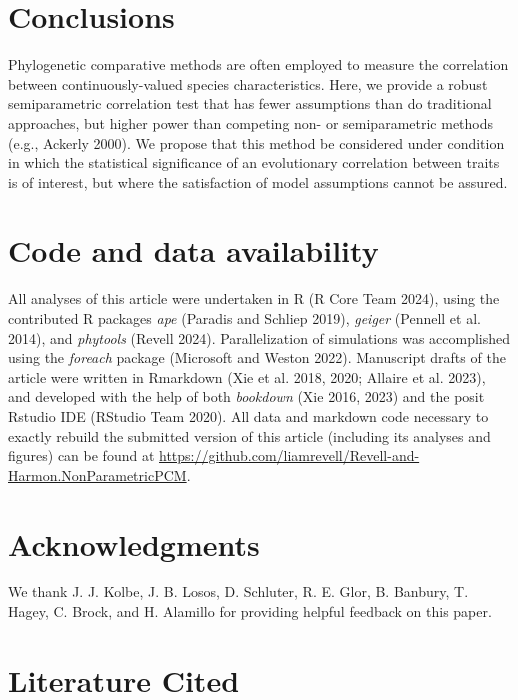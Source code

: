 \documentclass[fleqn,10pt,lineno]{wlpeerj} %
\begin{document}
\section{Conclusions}\label{conclusions}

Phylogenetic comparative methods are often employed to measure the correlation between continuously-valued species characteristics. Here, we provide a robust semiparametric correlation test that has fewer assumptions than do traditional approaches, but higher power than competing non- or semiparametric methods (e.g., Ackerly 2000). We propose that this method be considered under condition in which the statistical significance of an evolutionary correlation between traits is of interest, but where the satisfaction of model assumptions cannot be assured.

\section{Code and data availability}\label{code-and-data-availability}

All analyses of this article were undertaken in R (R Core Team 2024), using the contributed R packages \emph{ape} (Paradis and Schliep 2019), \emph{geiger} (Pennell et al. 2014), and \emph{phytools} (Revell 2024). Parallelization of simulations was accomplished using the \emph{foreach} package (Microsoft and Weston 2022). Manuscript drafts of the article were written in Rmarkdown (Xie et al. 2018, 2020; Allaire et al. 2023), and developed with the help of both \emph{bookdown} (Xie 2016, 2023) and the posit Rstudio IDE (RStudio Team 2020). All data and markdown code necessary to exactly rebuild the submitted version of this article (including its analyses and figures) can be found at \url{https://github.com/liamrevell/Revell-and-Harmon.NonParametricPCM}.

\section{Acknowledgments}\label{acknowledgments}

We thank J. J. Kolbe, J. B. Losos, D. Schluter, R. E. Glor, B. Banbury, T. Hagey, C. Brock, and H. Alamillo for providing helpful feedback on this paper.

\section*{Literature Cited}\label{literature-cited}
\end{document}
